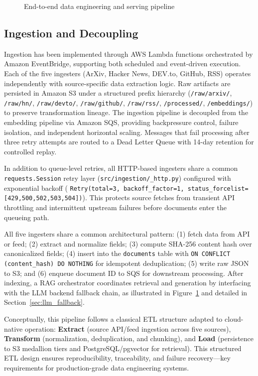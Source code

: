 \begin{figure}[H]
{\begin{tikzpicture}[node distance=0.4cm and 0.5cm, font=\small]
\end{tikzpicture}%
}
\caption{End-to-end data engineering and serving pipeline}
\label{fig:pipeline}
\end{figure}

\subsection{Ingestion and Decoupling}

Ingestion has been implemented through AWS Lambda functions orchestrated by Amazon EventBridge, supporting both scheduled and event-driven execution. Each of the five ingesters (ArXiv, Hacker News, DEV.to, GitHub, RSS) operates independently with source-specific data extraction logic. Raw artifacts are persisted in Amazon S3 under a structured prefix hierarchy (\texttt{/raw/arxiv/}, \texttt{/raw/hn/}, \texttt{/raw/devto/}, \texttt{/raw/github/}, \texttt{/raw/rss/}, \texttt{/processed/}, \texttt{/embeddings/}) to preserve transformation lineage. The ingestion pipeline is decoupled from the embedding pipeline via Amazon SQS, providing backpressure control, failure isolation, and independent horizontal scaling. Messages that fail processing after three retry attempts are routed to a Dead Letter Queue with 14-day retention for controlled replay.

In addition to queue-level retries, all HTTP-based ingesters share a common \texttt{requests.Session} retry layer (\texttt{src/ingestion/\_http.py}) configured with exponential backoff (
\texttt{Retry(total=3, backoff\_factor=1, status\_forcelist=[429,500,502,503,504])}). This protects source fetches from transient API throttling and intermittent upstream failures before documents enter the queueing path.

All five ingesters share a common architectural pattern: (1) fetch data from API or feed; (2) extract and normalize fields; (3) compute SHA-256 content hash over canonicalized fields; (4) insert into the \texttt{documents} table with \texttt{ON CONFLICT (content\_hash) DO NOTHING} for idempotent deduplication; (5) write raw JSON to S3; and (6) enqueue document ID to SQS for downstream processing. After indexing, a RAG orchestrator coordinates retrieval and generation by interfacing with the LLM backend fallback chain, as illustrated in Figure~\ref{fig:pipeline} and detailed in Section~\ref{sec:llm_fallback}.

Conceptually, this pipeline follows a classical ETL structure adapted to cloud-native operation: \textbf{Extract} (source API/feed ingestion across five sources), \textbf{Transform} (normalization, deduplication, and chunking), and \textbf{Load} (persistence to S3 medallion tiers and PostgreSQL/pgvector for retrieval). This structured ETL design ensures reproducibility, traceability, and failure recovery---key requirements for production-grade data engineering systems.

